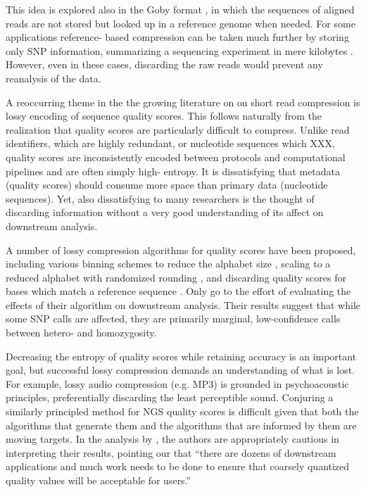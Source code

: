 \documentclass[twocolumn]{article}
\begin{document}

This idea is explored also in the Goby format \citep{Goby2012}, in which the
sequences of aligned reads are not stored but looked up in a reference genome
when needed. For some applications reference- based compression can be taken
much further by storing only SNP information, summarizing a sequencing
experiment in mere kilobytes \citep{Christley2009}. However, even in these
cases, discarding the raw reads would prevent any reanalysis of the data.



A reoccurring theme in the  the growing literature on on short read
compression is lossy encoding of sequence quality scores. This follows
naturally from the realization that quality scores are particularly difficult
to compress. Unlike read identifiers, which are highly redundant, or
nucleotide sequences which XXX, quality scores are inconsistently encoded
between protocols and computational pipelines and are often simply high-
entropy. It is dissatisfying that metadata (quality scores) should consume
more space than primary data (nucleotide sequences). Yet, also dissatisfying
to many researchers is the thought of discarding information without a very
good understanding of its affect on downstream analysis.

A number of lossy compression algorithms for quality scores have been
proposed, including various binning schemes to reduce the alphabet size
\citep{Wan2011}, scaling to a reduced alphabet with randomized rounding
\citep{Kozanitis2011}, and discarding quality scores for bases which match a
reference sequence \citep{Hsi-YangFritz2011}. Only \citet{Kozanitis2011} go to
the effort of evaluating the effects of their algorithm on downstream
analysis. Their results suggest that while some SNP calls are affected, they
are primarily marginal, low-confidence calls between hetero- and homozygosity.


Decreasing the entropy of quality scores while retaining accuracy is an
important goal, but successful lossy compression demands an understanding of
what is lost. For example, lossy audio compression (e.g. MP3) is grounded in
psychoacoustic principles, preferentially discarding the least perceptible
sound. Conjuring a similarly principled method for NGS quality scores is
difficult given that both the algorithms that generate them and the algorithms
that are informed by them are moving targets. In the analysis by
\citet{Kozanitis2011}, the authors are appropriately cautious in interpreting
their results, pointing our that ``there are dozens of downstream applications
and much work needs to be done to ensure that coarsely quantized quality
values will be acceptable for users.''
\end{document}
